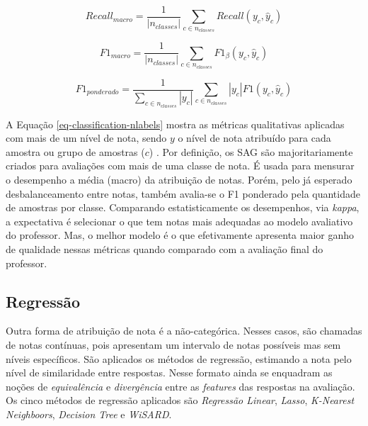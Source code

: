 \begin{equation*}
Recall_{macro} = \frac{1}{\left|n_{classes}\right|} \sum_{c \in n_{classes}} Recall(y_c, \hat{y}_c)
\end{equation*}

\begin{equation*}
F{1}_{macro} = \frac{1}{\left|n_{classes}\right|} \sum_{c \in n_{classes}} F{1}_\beta(y_c, \hat{y}_c)
\end{equation*}

\begin{equation*}
F{1}_{ponderado} = \frac{1}{\sum_{c \in n_{classes}} \left|y_c\right|} \sum_{c \in n_{classes}} \left|y_c\right| F{1}(y_c, \hat{y}_c)
\end{equation*}

A Equação \ref{eq-classification-nlabels} mostra as métricas qualitativas aplicadas com mais de um nível de nota, sendo $y$ o nível de nota atribuído para cada amostra ou grupo de amostras ($c$) \cite{manning2008}. Por definição, os SAG são majoritariamente criados para avaliações com mais de uma classe de nota. É usada para mensurar o desempenho a média (macro) da atribuição de notas. Porém, pelo já esperado desbalanceamento entre notas, também avalia-se o F1 ponderado pela quantidade de amostras por classe. Comparando estatisticamente os desempenhos, via \textit{kappa}, a expectativa é selecionar o que tem notas mais adequadas ao modelo avaliativo do professor. Mas, o melhor modelo é o que efetivamente apresenta maior ganho de qualidade nessas métricas quando comparado com a avaliação final do professor.


\subsection{Regressão}
\label{subsec-regressao}

Outra forma de atribuição de nota é a não-categórica. Nesses casos, são chamadas de notas contínuas, pois apresentam um intervalo de notas possíveis mas sem níveis específicos. São aplicados os métodos de regressão, estimando a nota pelo nível de similaridade entre respostas. Nesse formato ainda se enquadram as noções de \textit{equivalência} e \textit{divergência} entre as \textit{features} das respostas na avaliação. Os cinco métodos de regressão aplicados são \textit{Regressão Linear}, \textit{Lasso}, \textit{K-Nearest Neighboors}, \textit{Decision Tree} e \textit{WiSARD}.

